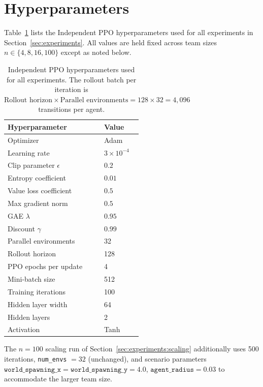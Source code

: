 \documentclass[11pt]{article}
\theoremstyle{plain}
\theoremstyle{definition}
\theoremstyle{remark}
\begin{document}
\section{Hyperparameters}
\label{app:hyperparams}

Table~\ref{tab:hyperparams} lists the Independent PPO hyperparameters
used for all experiments in Section~\ref{sec:experiments}. All values
are held fixed across team sizes $n \in \{4, 8, 16, 100\}$ except as
noted below.

\begin{table}[t]
\centering
\begin{tabular}{ll}
\toprule
\textbf{Hyperparameter} & \textbf{Value} \\
\midrule
Optimizer & Adam \\
Learning rate & $3 \times 10^{-4}$ \\
Clip parameter $\epsilon$ & $0.2$ \\
Entropy coefficient & $0.01$ \\
Value loss coefficient & $0.5$ \\
Max gradient norm & $0.5$ \\
GAE $\lambda$ & $0.95$ \\
Discount $\gamma$ & $0.99$ \\
Parallel environments & 32 \\
Rollout horizon & 128 \\
PPO epochs per update & 4 \\
Mini-batch size & 512 \\
Training iterations & 100 \\
Hidden layer width & 64 \\
Hidden layers & 2 \\
Activation & Tanh \\
\bottomrule
\end{tabular}
\caption{Independent PPO hyperparameters used for all experiments.
The rollout batch per iteration is $\text{Rollout horizon} \times
\text{Parallel environments} = 128 \times 32 = 4{,}096$ transitions
per agent.}
\label{tab:hyperparams}
\end{table}
The $n = 100$ scaling run of Section~\ref{sec:experiments:scaling} additionally uses 500 iterations, \texttt{num\_envs} $= 32$ (unchanged), and scenario parameters $\texttt{world\_spawning\_x} = \texttt{world\_spawning\_y} = 4.0$, $\texttt{agent\_radius} = 0.03$ to accommodate the larger team size.



\end{document}
